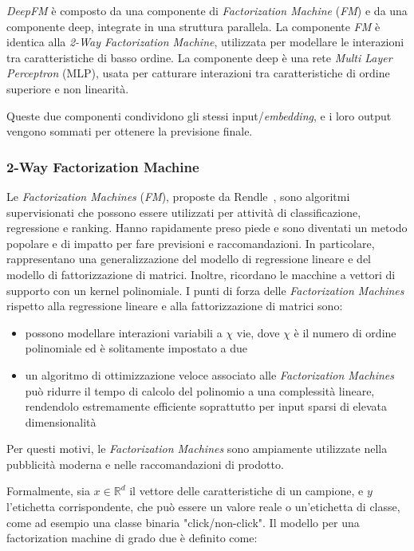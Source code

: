 \textit{DeepFM} è composto da una componente di \textit{Factorization Machine} (\textit{FM}) e da una componente deep, integrate in una struttura parallela. La componente \textit{FM} è identica alla \textit{2-Way Factorization Machine}, utilizzata per modellare le interazioni tra caratteristiche di basso ordine. La componente deep è una rete \textit{Multi Layer Perceptron} (MLP), usata per catturare interazioni tra caratteristiche di ordine superiore e non linearità.

Queste due componenti condividono gli stessi input/\textit{embedding}, e i loro output vengono sommati per ottenere la previsione finale.

\subsubsection{2-Way Factorization Machine}

Le \textit{Factorization Machines} (\textit{FM}), proposte da Rendle~\cite{FM}, sono algoritmi supervisionati che possono essere utilizzati per attività di classificazione, regressione e ranking. Hanno rapidamente preso piede e sono diventati un metodo popolare e di impatto per fare previsioni e raccomandazioni. In particolare, rappresentano una generalizzazione del modello di regressione lineare e del modello di fattorizzazione di matrici. Inoltre, ricordano le macchine a vettori di supporto con un kernel polinomiale. I punti di forza delle \textit{Factorization Machines} rispetto alla regressione lineare e alla fattorizzazione di matrici sono: 
\begin{itemize}
    \item possono modellare interazioni variabili a $\chi$ vie, dove $\chi$ è il numero di ordine polinomiale ed è solitamente impostato a due
    \item un algoritmo di ottimizzazione veloce associato alle \textit{Factorization Machines} può ridurre il tempo di calcolo del polinomio a una complessità lineare, rendendolo estremamente efficiente soprattutto per input sparsi di elevata dimensionalità
\end{itemize}

Per questi motivi, le \textit{Factorization Machines} sono ampiamente utilizzate nella pubblicità moderna e nelle raccomandazioni di prodotto.


Formalmente, sia $x \in \mathbb{R}^d$ il vettore delle caratteristiche di un campione, e $y$ l'etichetta corrispondente, che può essere un valore reale o un'etichetta di classe, come ad esempio una classe binaria "click/non-click".  
Il modello per una factorization machine di grado due è definito come:

